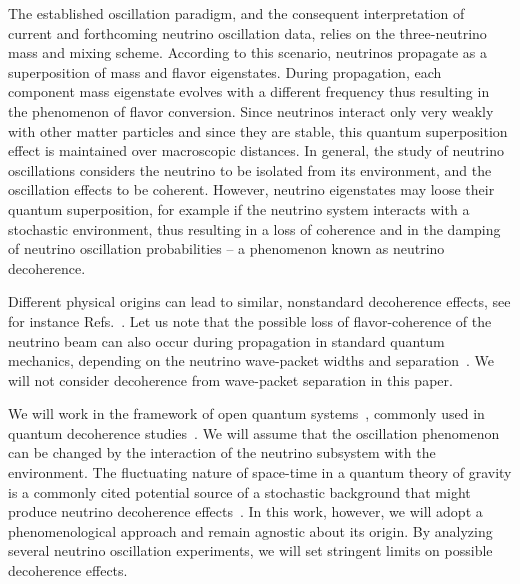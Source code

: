 \documentclass[aps, prd, onecolumn, tightenlines, notitlepage, superscriptaddress, nofootinbib, preprintnumbers, floatfix,showkeys,11pt]{revtex4-2}
\begin{document}
The established oscillation paradigm, and the consequent interpretation of current and forthcoming neutrino oscillation data, relies on the three-neutrino mass and mixing scheme. According to this scenario,
neutrinos propagate as a superposition of mass and flavor eigenstates. During propagation, each component mass eigenstate evolves with a different frequency thus resulting in the phenomenon of flavor conversion.
%
Since neutrinos interact only very weakly with other matter particles and since they are stable, this quantum superposition effect is maintained over macroscopic distances. In general, the study of neutrino oscillations considers the neutrino to be isolated from its environment, and the oscillation effects to be coherent. However, neutrino eigenstates may loose their quantum superposition, for example if the neutrino system interacts with a stochastic environment, thus resulting in a loss of coherence and in the damping of neutrino oscillation probabilities -- a phenomenon known as neutrino decoherence.

Different physical origins can lead to similar, nonstandard decoherence effects, see for instance Refs.~\cite{Kiers:1995zj,Ohlsson:2000mj,Beuthe:2001rc,Beuthe:2002ej,Giunti:2003ax,Blennow:2005yk,Farzan:2008eg,Kayser:2010pr,Jones:2014sfa,Akhmedov:2019iyt,Grimus:2019hlq,Naumov:2020yyv,Akhmedov:2022bjs,Krueger:2023skk}. Let us note that the possible loss of flavor-coherence of the neutrino beam can also occur during propagation in standard quantum mechanics, depending on the neutrino wave-packet widths and separation~\cite{Giunti:1991sx,Beuthe:2002ej,Kayser:2010pr,Naumov:2013uia,deGouvea:2020hfl,deGouvea:2021uvg}. We will not consider decoherence from wave-packet separation in this paper.

We will work in the framework of open quantum systems~\cite{Breuer:2002pc}, commonly used in quantum decoherence studies~\cite{Benatti:2000ph,Lisi:2000zt,Benatti:2001fa, Morgan:2004vv,Anchordoqui:2005gj,Fogli:2007tx,Farzan:2008zv, Jones:2014sfa,  BalieiroGomes:2016ykp, Coelho:2017zes, Coelho:2017byq, Carpio:2017nui,   Coloma:2018idr, Carpio:2018gum, Carrasco:2018sca, Buoninfante:2020iyr, Gomes:2020muc, Ohlsson:2020gxx,Stuttard:2020qfv,Stuttard:2021uyw}. We will assume that the oscillation phenomenon can be changed by the interaction of the neutrino subsystem with the environment. 
%
The fluctuating nature of space-time in a quantum theory of gravity is a commonly cited potential source of a stochastic background that might produce neutrino decoherence effects~\cite{Hawking:1976ra,Ellis:1983jz,Giddings:1988cx,Addazi:2021xuf}.
%
In this work, however, we will adopt a phenomenological approach and remain agnostic about its origin. By analyzing several neutrino oscillation experiments, we will set stringent limits on possible decoherence effects.
\end{document}
